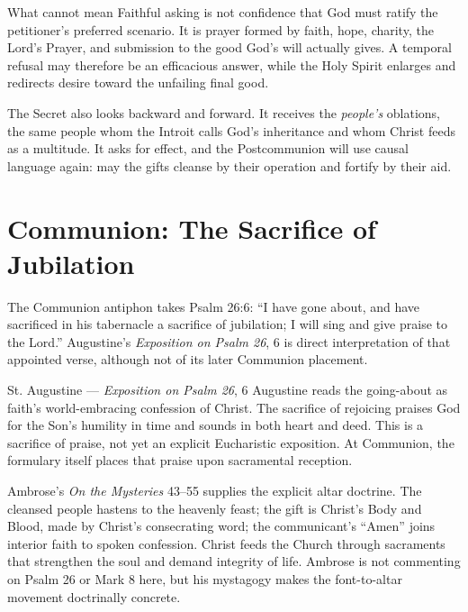 \begin{deepstudy}
\begin{studybox}{What  cannot mean}
Faithful asking is not confidence that God must ratify the petitioner's preferred scenario. It is prayer formed by faith, hope, charity, the Lord's Prayer, and submission to the good God's will actually gives. A temporal refusal may therefore be an efficacious answer, while the Holy Spirit enlarges and redirects desire toward the unfailing final good.
\end{studybox}

The Secret also looks backward and forward. It receives the \emph{people's} oblations, the same people whom the Introit calls God's inheritance and whom Christ feeds as a multitude. It asks for effect, and the Postcommunion will use causal language again: may the gifts cleanse by their operation and fortify by their aid.

\sectionguard
\section*{Communion: The Sacrifice of Jubilation}

The Communion antiphon takes Psalm 26:6: ``I have gone about, and have sacrificed in his tabernacle a sacrifice of jubilation; I will sing and give praise to the Lord.'' Augustine's \emph{Exposition on Psalm 26}, 6 is direct interpretation of that appointed verse, although not of its later Communion placement.

\begin{sourcecard}{St. Augustine --- \emph{Exposition on Psalm 26}, 6}
Augustine reads the going-about as faith's world-embracing confession of Christ. The sacrifice of rejoicing praises God for the Son's humility in time and sounds in both heart and deed. This is a sacrifice of praise, not yet an explicit Eucharistic exposition. At Communion, the formulary itself places that praise upon sacramental reception.
\end{sourcecard}

Ambrose's \emph{On the Mysteries} 43--55 supplies the explicit altar doctrine. The cleansed people hastens to the heavenly feast; the gift is Christ's Body and Blood, made by Christ's consecrating word; the communicant's ``Amen'' joins interior faith to spoken confession. Christ feeds the Church through sacraments that strengthen the soul and demand integrity of life. Ambrose is not commenting on Psalm 26 or Mark 8 here, but his mystagogy makes the font-to-altar movement doctrinally concrete.


\end{deepstudy}
